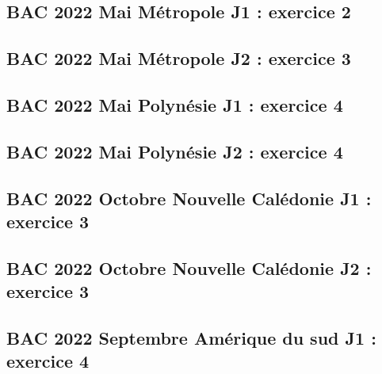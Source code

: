 \documentclass[lang=fr,edition=teacher,layout=sheet]{mxbook}
\begin{document}
\begingroup\endgroup
\par\bigskip
{}\subsection*{BAC 2022 Mai Métropole J1 : exercice 2}
\begingroup\endgroup
\par\bigskip
{}\subsection*{BAC 2022 Mai Métropole J2 : exercice 3}
\begingroup\endgroup
\par\bigskip
{}\subsection*{BAC 2022 Mai Polynésie J1 : exercice 4}
\begingroup\endgroup
\par\bigskip
{}\subsection*{BAC 2022 Mai Polynésie J2 : exercice 4}
\begingroup\endgroup
\par\bigskip
{}\subsection*{BAC 2022 Octobre Nouvelle Calédonie J1 : exercice 3}
\begingroup\endgroup
\par\bigskip
{}\subsection*{BAC 2022 Octobre Nouvelle Calédonie J2 : exercice 3}
\begingroup\endgroup
\par\bigskip
{}\subsection*{BAC 2022 Septembre Amérique du sud J1 : exercice 4}
\end{document}
